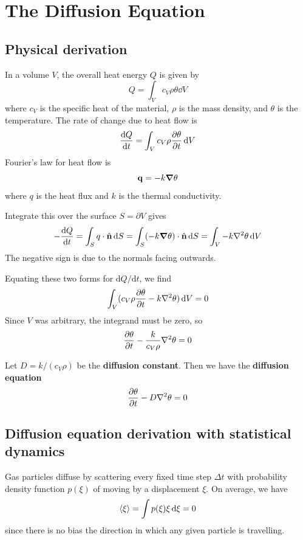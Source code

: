 \documentclass[a4paper]{article}
\begin{document}
\section{The Diffusion Equation}
\subsection{Physical derivation}
In a volume \( V \), the overall heat energy \( Q \) is given by
\[
	Q = \int_V c_V \rho \theta \dd{V}
\]
where \( c_V \) is the specific heat of the material, \( \rho \) is the mass density, and \( \theta \) is the temperature.
The rate of change due to heat flow is
\[
	\dv{Q}{t} = \int_V c_V \rho \pdv{\theta}{t} \dd{V}
\]
Fourier's law for heat flow is
\[
	{\bf q} = -k \grad{\theta}
\]
where \( q \) is the heat flux and $k$ is the thermal conductivity. 

Integrate this over the surface \( S = \partial V \) gives
\[
	-\dv{Q}{t} = \int_S q \cdot \hat \bfn \dd{S} = \int_S (-k \grad{\theta}) \cdot \hat \bfn \dd{S} = \int_V -k \laplacian{\theta} \dd{V}
\]
The negative sign is due to the normals facing outwards.

Equating these two forms for \( \mathrm{d} Q/ \mathrm{d} t \), we find
\[
	\int_V (c_V \rho \pdv{\theta}{t} - k \laplacian{\theta}) \dd{V} = 0
\]
Since \( V \) was arbitrary, the integrand must be zero, so
\[
	\pdv{\theta}{t} - \frac{k}{c_V \rho} \laplacian{\theta} = 0
\]
\begin{definition}
    Let \( D = k/(c_V \rho) \) be the \textbf{diffusion constant}.
    Then we have the \textbf{diffusion equation}
    \[
        \pdv{\theta}{t} - D \laplacian{\theta} = 0
    \]
\end{definition}

\subsection{Diffusion equation derivation with statistical dynamics}
Gas particles diffuse by scattering every fixed time step \( \Delta t \) with probability density function \( p(\xi) \) of moving by a displacement \( \xi \).
On average, we have
\[
	\left\langle{\xi}\right\rangle = \int p(\xi) \xi \dd{\xi} = 0
\]
since there is no bias the direction in which any given particle is travelling.
\end{document}
